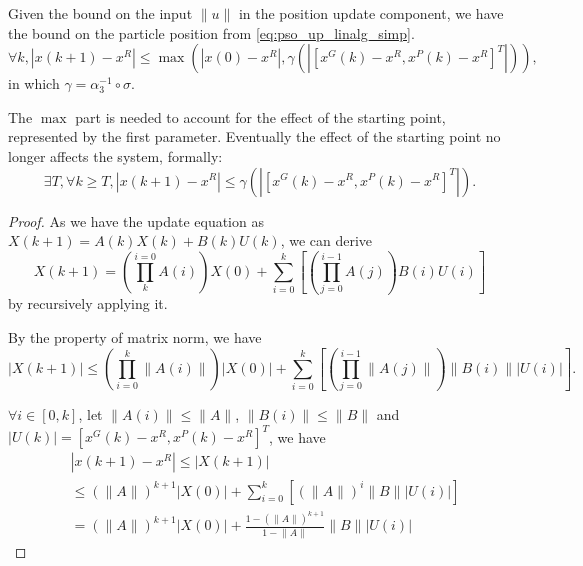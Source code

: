 \begin{mythm}
\label{thm:state_bound}
Given the bound on the input $ \lVert u \rVert $ in the position update component, we have the bound on the particle position from \eqref{eq:pso_up_linalg_simp}.
\begin{equation}
\label{eq:state_bound}
\forall k, 
| x(k+1) - x^{R} | \leq \max ( | x(0) - x^{R} | , \gamma ( | [ x^{G}(k) - x^{R}, x^{P}(k) - x^{R} ]^{T} | ) ),
\end{equation}
in which $ \gamma = \alpha_{3}^{-1} \circ \sigma $.

The $ \max $ part is needed to account for the effect of the starting point, represented by the first parameter. Eventually the effect of the starting point no longer affects the system, formally:
\begin{equation}
\label{eq:state_bound:conv}
\exists T, \forall k \geq T, 
|  x(k+1) - x^{R} | \leq \gamma ( | [ x^{G}(k) - x^{R}, x^{P}(k) - x^{R} ]^{T} | ).
\end{equation}
\begin{proof}
As we have the update equation as
$ X(k+1) = A(k) X(k) + B(k) U(k) $, we can derive 
\begin{equation}
X(k+1) = ( \prod_{k}^{i=0} A(i) ) X(0) + \sum_{i=0}^{k} [ ( \prod_{j=0}^{i-1} A(j) ) B(i) U(i)  ] 
\end{equation}
by recursively applying it.

By the property of matrix norm, we have
\begin{equation}
| X(k+1) | \leq ( \prod_{i=0}^{k} \lVert A(i) \rVert ) | X(0) | + \sum_{i=0}^{k} [ ( \prod_{j=0}^{i-1} \lVert A(j) \rVert ) \lVert B(i) \rVert | U(i) |  ].
\end{equation}

$ \forall i \in [0, k] $, let $ \lVert A(i) \rVert \leq \lVert A \rVert $, $  \lVert B(i) \rVert \leq \lVert B \rVert $ and $ | U(k) | = [ x^{G}(k) - x^{R}, x^{P}(k) - x^{R} ]^{T} $, we have
\begin{equation}
\label{eq:bound:final}
\begin{aligned}
& |  x(k+1) - x^{R} | \leq | X(k+1) | \\
& \leq ( \lVert A \rVert )^{k+1} | X(0) | + \sum_{i=0}^{k} [ ( \lVert A \rVert )^{i} \lVert B \rVert | U(i) |  ] \\
& = ( \lVert A \rVert )^{k+1} | X(0) | + \frac{1 - ( \lVert A \rVert )^{k+1} }{1 - \lVert A \rVert }  \lVert B \rVert | U(i) |
\end{aligned}
\end{equation}


\end{proof}
\end{mythm}
